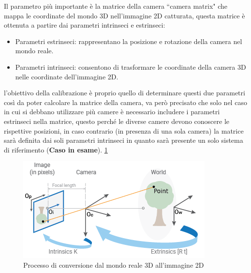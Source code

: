 \documentclass[12pt,a4paper,openright,twoside]{book}
\begin{document}
Il parametro più importante è la matrice della camera ``camera matrix" che mappa le coordinate del mondo 3D nell'immagine 2D catturata, questa matrice è ottenuta a partire dai parametri intrinseci e estrinseci:
\begin{itemize}
	\item Parametri estrinseci: rappresentano la posizione e rotazione della camera nel mondo reale.
	\item Parametri intrinseci: consentono di trasformare le coordinate della camera 3D nelle coordinate dell'immagine 2D.
\end{itemize}
l'obiettivo della calibrazione è proprio quello di determinare questi due parametri così da poter calcolare la matrice della camera, va però precisato che solo nel caso in cui si debbano utilizzare più camere è necessario includere i parametri estrinseci nella matrice, questo perché le diverse camere devono conoscere le rispettive posizioni, in caso contrario (in presenza di una sola camera) la matrice sarà definita dai soli parametri intrinseci in quanto sarà presente un solo sistema di riferimento (\textbf{Caso in esame}). \ref{fig:calibration_cameramodel_coords}
\begin{figure}[h!]
	\centering
	\includegraphics[width=0.5\linewidth]{./figures/calibration-cameramodel-coords.png}
	\caption{Processo di conversione dal mondo reale 3D all'immagine 2D}
	\label{fig:calibration_cameramodel_coords}
\end{figure}
\end{document}
